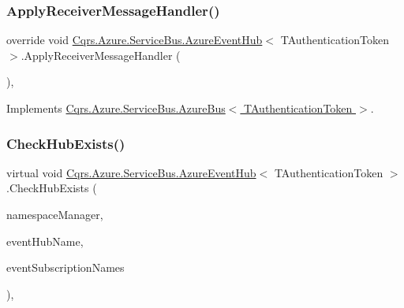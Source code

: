 \subsubsection{\texorpdfstring{Apply\+Receiver\+Message\+Handler()}{ApplyReceiverMessageHandler()}}
{\footnotesize\ttfamily override void \hyperlink{classCqrs_1_1Azure_1_1ServiceBus_1_1AzureEventHub}{Cqrs.\+Azure.\+Service\+Bus.\+Azure\+Event\+Hub}$<$ T\+Authentication\+Token $>$.Apply\+Receiver\+Message\+Handler (\begin{DoxyParamCaption}{ }\end{DoxyParamCaption})\hspace{0.3cm}{\ttfamily [protected]}, {\ttfamily [virtual]}}



Implements \hyperlink{classCqrs_1_1Azure_1_1ServiceBus_1_1AzureBus_aad25a164e9e526c59d8ef98635c98095_aad25a164e9e526c59d8ef98635c98095}{Cqrs.\+Azure.\+Service\+Bus.\+Azure\+Bus$<$ T\+Authentication\+Token $>$}.

\mbox{\label{classCqrs_1_1Azure_1_1ServiceBus_1_1AzureEventHub_af9cafb2d7025844b0bf37ee6a6a0f635_af9cafb2d7025844b0bf37ee6a6a0f635}} 
\subsubsection{\texorpdfstring{Check\+Hub\+Exists()}{CheckHubExists()}}
{\footnotesize\ttfamily virtual void \hyperlink{classCqrs_1_1Azure_1_1ServiceBus_1_1AzureEventHub}{Cqrs.\+Azure.\+Service\+Bus.\+Azure\+Event\+Hub}$<$ T\+Authentication\+Token $>$.Check\+Hub\+Exists (\begin{DoxyParamCaption}\item[{Namespace\+Manager}]{namespace\+Manager,  }\item[{string}]{event\+Hub\+Name,  }\item[{string}]{event\+Subscription\+Names }\end{DoxyParamCaption})\hspace{0.3cm}{\ttfamily [protected]}, {\ttfamily [virtual]}}

\mbox{\label{classCqrs_1_1Azure_1_1ServiceBus_1_1AzureEventHub_af43ec28c427d2d45370ef2401864db4b_af43ec28c427d2d45370ef2401864db4b}} 
